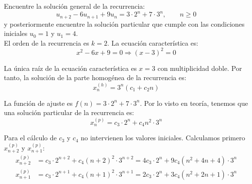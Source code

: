 \documentclass[12pt]{article}
\begin{document}
    \begin{ejercicio}[Recurrencia]
        Encuentre la solución general de la recurrencia:
        \begin{equation*}
            u_{n+2} - 6u_{n+1} + 9u_n = 3\cdot 2^n + 7\cdot 3^n,\qquad n\geq 0
        \end{equation*}
        y posteriormente encuentre la solución particular que cumple con las condiciones iniciales $u_0 = 1$ y $u_1 = 4$.\\
    
        El orden de la recurrencia es $k=2$. La ecuación característica es:
        \begin{equation*}
            x^2 - 6x + 9 = 0 \Longrightarrow (x-3)^2 = 0
        \end{equation*}

        La única raíz de la ecuación característica es $x=3$ con multiplicidad doble. Por tanto, la solución de la parte homogénea de la recurrencia es:
        \begin{equation*}
            x_n^{(h)} = 3^n(c_1 + c_2n)
        \end{equation*}
    
        La función de ajuste es $f(n) = 3\cdot 2^n + 7\cdot 3^n$. Por lo visto en teoría, tenemos que
        una solución particular de la recurrencia es:
        \begin{equation*}
            x_n^{(p)} = c_3\cdot 2^n + c_4n^2\cdot 3^n
        \end{equation*}
    
        Para el cálculo de $c_3$ y $c_4$ no intervienen los valores iniciales.
        Calculamos primero $x_{n+2}^{(p)}$ y $x_{n+1}^{(p)}$:
        \begin{align*}
            x_{n+2}^{(p)} &= c_3\cdot 2^{n+2} + c_4(n+2)^2\cdot 3^{n+2} = 4c_3\cdot 2^n + 9c_4(n^2+4n+4)\cdot 3^{n} \\
            x_{n+1}^{(p)} &= c_3\cdot 2^{n+1} + c_4(n+1)^2\cdot 3^{n+1} = 2c_3\cdot 2^n + 3c_4(n^2+2n+1)\cdot 3^{n}
        \end{align*}
    

\end{ejercicio}
\end{document}
